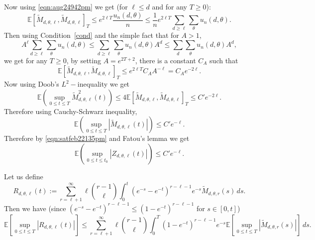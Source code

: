 \documentclass[11pt]{article}
\begin{document}
Now using \eqref{eqn:aug24942pm}  we get (for $\ell \leq d$ and for any $T\geq 0$):
\begin{equation*}
   \mathbb{E} \left[\widetilde{M}_{d,\theta,\ell},\widetilde{M}_{d,\theta,\ell}\right]_T \leq e^{2\ell T} \frac{u_n(d,\theta)}{n} \leq \frac{1}{n} e^{2\ell T}\sum_{d\geq \ell} \sum_{\theta} u_n(d,\theta).
\end{equation*}
Then using Condition~\ref{cond} and the simple fact that for $A>1$,
$$A^\ell\sum_{d\geq \ell} \sum_{\theta} u_n(d,\theta) \leq \sum_{d\geq \ell} \sum_{\theta} u_n(d,\theta) A^d \leq  \sum_{d} \sum_{\theta} u_n(d,\theta)A^d,$$ we get for any $T\geq 0$, by setting $A= e^{2T+2}$, there is a constant $C_A$ such that
\begin{equation*}%
   \mathbb{E} \left[\widetilde{M}_{d,\theta,\ell},\widetilde{M}_{d,\theta,\ell}\right]_T \leq e^{2\ell T}  C_A A^{-\ell}  = C_A e^{-2\ell}.
\end{equation*}
 Now using Doob's $L^2-$inequality we get
 $$
 \mathbb{E} \left( \sup_{0\leq t\leq T} \widetilde{M}_{d,\theta,\ell}^2(t)\right) \leq 4 \mathbb{E}\left[\widetilde{M}_{d,\theta,\ell},\widetilde{M}_{d,\theta,\ell}\right]_T \leq C' e^{-2\ell}.
 $$
Therefore using Cauchy-Schwarz inequality,
\begin{equation}\label{eqn:aug26540pm}
   \mathbb{E} \left( \sup_{0\leq t\leq T}| \widetilde{M}_{d,\theta,\ell}(t)|\right)  \leq C'e^{-\ell}.
\end{equation}
Therefore by \eqref{eqn:satfeb22135pm} and Fatou's lemma we get 
\begin{equation}\label{eqn:220pm25jan21}
    \mathbb{E}\left(\sup_{0\leq t\leq t_0}\left|Z_{d,\theta,\ell}(t)\right|\right) \leq C'e^{-\ell}.
\end{equation}


 Let us define 
 \begin{equation*}
 R_{d,\theta,\ell}(t):= \sum_{r=\ell+1}^{\infty}\ell{r-1\choose \ell}\int_{0}^t(e^{-s}-e^{-t})^{r-\ell-1}e^{-s} \widetilde{M}_{d,\theta,r}(s) \, ds.
 \end{equation*}
 Then we have (since $(e^{-s}-e^{-t})^{r-\ell-1}\leq (1-e^{-t})^{r-\ell-1}$ for $s\in[0,t]$)
 \begin{equation*}
\mathbb{E}\left[ \sup_{0\leq t\leq T}\left|R_{d,\theta,\ell}(t)\right|\right] \leq \sum_{r=\ell+1}^{\infty}\ell{r-1\choose \ell}\int_{0}^T(1-e^{-t})^{r-\ell-1}e^{-s}\mathbb{E} \left[\sup_{0\leq t\leq T} \left|\widetilde{M}_{d,\theta,r}(s)\right|\right] \, ds.
    \end{equation*}
\end{document}
